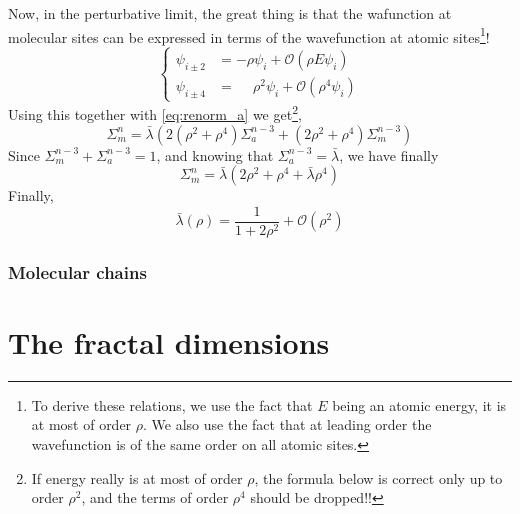 \documentclass[11pt]{article}
\begin{document}
Now, in the perturbative limit, the great thing is that the wafunction at molecular sites can be expressed in terms of the wavefunction at atomic sites\footnote{To derive these relations, we use the fact that $E$ being an atomic energy, it is at most of order $\rho$. We also use the fact that at leading order the wavefunction is of the same order on all atomic sites.}! 
\begin{equation}
	\begin{cases}
	\psi_{i\pm2} &= - \rho \psi_i + \mathcal{O}(\rho E \psi_i) \\
	\psi_{i\pm4} &= \phantom{-}\rho^2 \psi_i  + \mathcal{O}(\rho^4 \psi_i)
	\end{cases}
\end{equation}
Using this together with \eqref{eq:renorm_a} we get\footnote{If energy really is at most of order $\rho$, the formula below is correct only up to order $\rho^2$, and the terms of order $\rho^4$ should be dropped!!},
\begin{equation}
	\Sigma_m^n = \bar \lambda \left( 2(\rho^2 + \rho^4) \Sigma_a^{n-3} + (2 \rho^2 + \rho^4) \Sigma_m^{n-3} \right)
\end{equation}
Since $\Sigma_m^{n-3} + \Sigma_a^{n-3} = 1$, and knowing that $\Sigma_a^{n-3} = \bar \lambda$, we have finally
\begin{equation}
\boxed{
	\Sigma_m^n = \bar \lambda \left( 2 \rho^2 + \rho^4 + \bar \lambda \rho^4 \right)
}
\end{equation}
Finally,
\begin{equation}
\boxed{
	\bar \lambda(\rho) = \frac{1}{1+2\rho^2} +\mathcal{O}(\rho^2)
}
\end{equation}
\subsubsection{Molecular chains}

\section{The fractal dimensions}

{}

\end{document}
